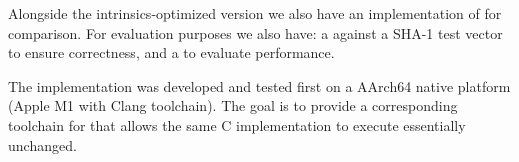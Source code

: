 %
Alongside the intrinsics-optimized version we also have an implementation of
 for comparison.
%
For evaluation purposes we also have: a  against a SHA-1 test vector to ensure correctness, and a
 to evaluate performance.

The implementation was developed and tested first on a AArch64 native platform
(Apple M1 with Clang toolchain). The goal is to provide a corresponding
toolchain for \wasm that allows the same C implementation to execute essentially
unchanged.

